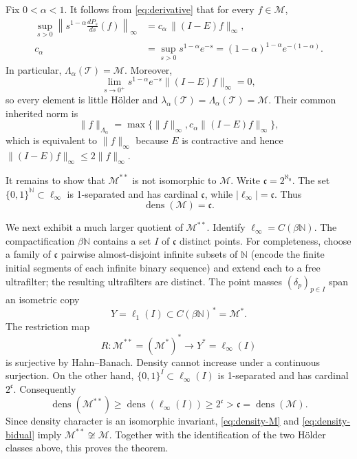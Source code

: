 \documentclass[11pt]{article}
\newcommand{\M}{\mathcal M}
\newcommand{\T}{\mathcal T}
\newcommand{\N}{\mathbb N}
\newcommand{\dens}{\operatorname{dens}}
\begin{document}
Fix $0<\alpha<1$.  It follows from \eqref{eq:derivative} that for every
$f\in\M$,
\begin{align}
 \sup_{s>0}\left\|s^{1-\alpha}\frac{dP_s}{ds}(f)\right\|_\infty
 &=c_\alpha\,\|(I-E)f\|_\infty,\label{eq:seminorm}\\
 c_\alpha&=\sup_{s>0}s^{1-\alpha}e^{-s}
 =(1-\alpha)^{1-\alpha}e^{-(1-\alpha)}.
\end{align}
In particular, $\Lambda_\alpha(\T)=\M$.  Moreover,
\[
 \lim_{s\to0^+}s^{1-\alpha}e^{-s}\|(I-E)f\|_\infty=0,
\]
so every element is little H\"older and
$\lambda_\alpha(\T)=\Lambda_\alpha(\T)=\M$.  Their common inherited norm is
\[
 \|f\|_{\Lambda_\alpha}
 =\max\{\|f\|_\infty,c_\alpha\|(I-E)f\|_\infty\},
\]
which is equivalent to $\|f\|_\infty$ because $E$ is contractive and hence
$\|(I-E)f\|_\infty\leq2\|f\|_\infty$.

It remains to show that $\M^{**}$ is not isomorphic to $\M$.  Write
$\mathfrak c=2^{\aleph_0}$.  The set $\{0,1\}^{\N}\subset\ell_\infty$ is
1-separated and has cardinal $\mathfrak c$, while
$|\ell_\infty|=\mathfrak c$.  Thus
\begin{equation}\label{eq:density-M}
 \dens(\M)=\mathfrak c.
\end{equation}

We next exhibit a much larger quotient of $\M^{**}$.  Identify
$\ell_\infty=C(\beta\N)$.  The compactification $\beta\N$ contains a set
$I$ of $\mathfrak c$ distinct points.  For completeness, choose a family of
$\mathfrak c$ pairwise almost-disjoint infinite subsets of $\N$ (encode the
finite initial segments of each infinite binary sequence) and extend each to
a free ultrafilter; the resulting ultrafilters are distinct.  The point
masses $(\delta_p)_{p\in I}$ span an isometric copy
\[
 Y=\ell_1(I)\subset C(\beta\N)^*=\M^*.
\]
The restriction map
\[
 R:\M^{**}=(\M^*)^*\longrightarrow Y^*=\ell_\infty(I)
\]
is surjective by Hahn--Banach.  Density cannot increase under a continuous
surjection.  On the other hand, $\{0,1\}^{I}\subset\ell_\infty(I)$ is
1-separated and has cardinal $2^{\mathfrak c}$.  Consequently
\begin{equation}\label{eq:density-bidual}
 \dens(\M^{**})\geq\dens(\ell_\infty(I))\geq2^{\mathfrak c}
 >\mathfrak c=\dens(\M).
\end{equation}
Since density character is an isomorphic invariant, \eqref{eq:density-M} and
\eqref{eq:density-bidual} imply $\M^{**}\not\cong\M$.  Together with the
identification of the two H\"older classes above, this proves the theorem.
\end{document}
